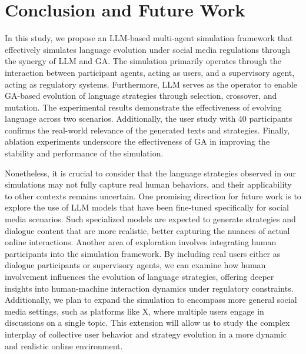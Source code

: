 \section{Conclusion and Future Work}
\label{sec: conclusion}
In this study, we propose an LLM-based multi-agent simulation framework that effectively simulates language evolution under social media regulations through the synergy of LLM and GA. The simulation primarily operates through the interaction between participant agents, acting as users, and a supervisory agent, acting as regulatory systems. Furthermore, LLM serves as the operator to enable GA-based evolution of language strategies through selection, crossover, and mutation. The experimental results demonstrate the effectiveness of evolving language across two scenarios. Additionally, the user study with 40 participants confirms the real-world relevance of the generated texts and strategies. Finally, ablation experiments underscore the effectiveness of GA in improving the stability and performance of the simulation.

Nonetheless, it is crucial to consider that the language strategies observed in our simulations may not fully capture real human behaviors, and their applicability to other contexts remains uncertain.
One promising direction for future work is to explore the use of LLM models that have been fine-tuned specifically for social media scenarios. Such specialized models are expected to generate strategies and dialogue content that are more realistic, better capturing the nuances of actual online interactions.
Another area of exploration involves integrating human participants into the simulation framework. By including real users either as dialogue participants or supervisory agents, we can examine how human involvement influences the evolution of language strategies, offering deeper insights into human-machine interaction dynamics under regulatory constraints.
Additionally, we plan to expand the simulation to encompass more general social media settings, such as platforms like X, where multiple users engage in discussions on a single topic. This extension will allow us to study the complex interplay of collective user behavior and strategy evolution in a more dynamic and realistic online environment.